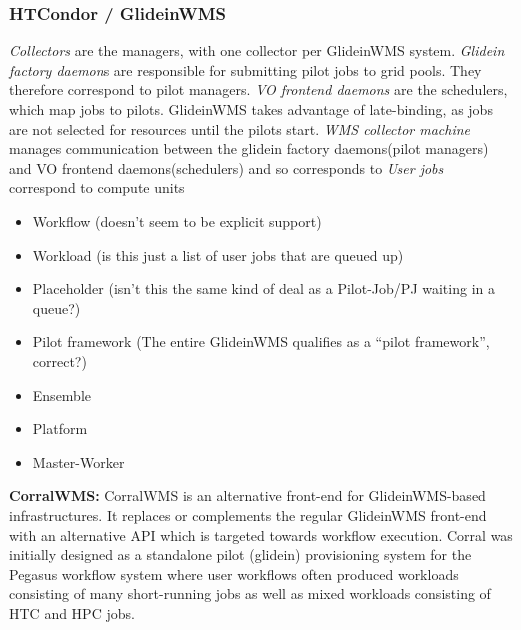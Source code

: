 \documentclass{sig-alternate}
\begin{document}
%
\subsubsection{HTCondor / GlideinWMS}

\textit{Collectors} are the managers, with one collector per
GlideinWMS system.
\textit{Glidein factory daemon}s are responsible for
submitting pilot jobs to grid pools.
They therefore correspond to pilot managers.
\textit{VO frontend daemons} are the schedulers, which map jobs
to pilots.  GlideinWMS takes advantage of late-binding, as
jobs are not selected for resources until the pilots start.
\textit{WMS collector machine} manages communication between the glidein
factory daemons(pilot managers) and VO frontend daemons(schedulers)
and so corresponds to 
\textit{User jobs} correspond to compute units 

\begin{itemize}
\item Workflow (doesn't seem to be explicit support)
\item Workload (is this just a list of user jobs that are queued up)
\item Placeholder (isn't this the same kind of deal as a Pilot-Job/PJ
waiting in a queue?)
\item Pilot framework (The entire GlideinWMS qualifies as a ``pilot
framework'', correct?)
\item Ensemble 
\item Platform 
\item Master-Worker 
\end{itemize}

\textbf{CorralWMS:} CorralWMS is an alternative front-end for GlideinWMS-based
infrastructures. It replaces or complements the regular GlideinWMS front-end
with an alternative API which is targeted towards workflow execution. Corral was
initially designed as a standalone pilot (glidein) provisioning system for
the Pegasus workflow system where user  workflows often produced workloads
consisting of many short-running jobs as well as mixed workloads consisting of
HTC and HPC jobs.
\end{document}
